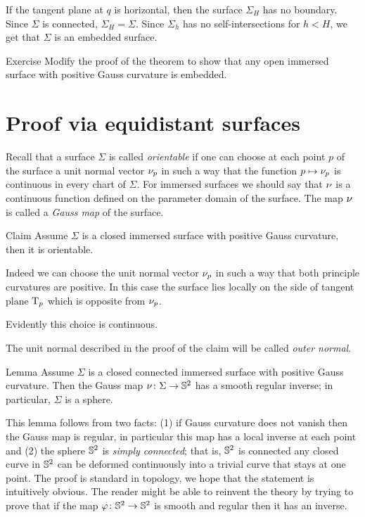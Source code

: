 If the tangent plane at $q$ is horizontal,
then the surface $\Sigma_H$ has no boundary.
Since $\Sigma$ is connected, $\Sigma_H=\Sigma$.
Since $\Sigma_h$ has no self-intersections for $h<H$, we get that $\Sigma$ is an embedded surface.
\qeds

\begin{thm}{Exercise}
Modify the proof of the theorem to show that any open immersed surface with positive Gauss curvature is embedded.
\end{thm}

\section*{Proof via equidistant surfaces}

Recall that a surface $\Sigma$ is called \emph{orientable} if one can choose at each point $p$ of the surface
a unit normal vector $\nu_p$  in such a way that the function $p\mapsto \nu_p$ is continuous in every chart of $\Sigma$.
For immersed surfaces we should say that $\nu$ is a continuous function defined on the parameter domain of the surface.
The map $\nu$ is called a \emph{Gauss map} of the surface.

\begin{thm}{Claim}
Assume $\Sigma$ is a closed immersed surface with positive Gauss curvature, then it is orientable.
\end{thm}


 Indeed we can choose the unit normal vector $\nu_p$ in such a way that both principle curvatures are positive. 
In this case the surface lies locally on the side of tangent plane $\mathrm{T}_p$ which is opposite from $\nu_p$.

Evidently this choice is  continuous.
\qeds

The unit normal described in the proof of the claim will be called \emph{outer normal}.

\begin{thm}{Lemma}\label{lem:gauss-inverse}
Assume $\Sigma$ is a closed connected immersed surface with positive Gauss curvature.
Then the Gauss map $\nu\colon\Sigma \to \mathbb{S}^2$ has a smooth regular inverse;
in particular, $\Sigma$ is a sphere.
\end{thm}

This lemma follows from two facts:
(1) if Gauss curvature does not vanish then the  Gauss map is regular, in particular this map has a local inverse at each point
and
(2) the sphere $\mathbb{S}^2$ is \emph{simply connected};
that is, $\mathbb{S}^2$ is connected any closed curve in $\mathbb{S}^2$ can be deformed continuously into a trivial curve that stays at one point.
The proof is standard in topology, we hope that the statement is intuitively obvious.
The reader might be able to reinvent the theory by trying to prove that if the map $\varphi\colon\mathbb{S}^2\to\mathbb{S}^2$ is smooth and regular then it has an inverse.

